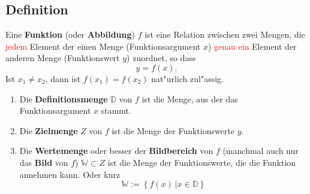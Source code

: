 \subsection{Definition}
Eine \textbf{Funktion} (oder \textbf{Abbildung}) $f$ ist eine Relation zwischen zwei Mengen, die \textcolor{red}{jedem} Element der einen Menge (Funktionsargument $x$) \textcolor{red}{genau ein} Element der anderen Menge (Funktionswert $y$) zuordnet, so dass $$y=f(x).$$
Ist $x_1 \neq x_2$, dann ist $f(x_1) = f(x_2)$ nat"urlich zul"assig.
\begin{enumerate}
\item Die \textbf{Definitionsmenge} $\mathbb{D}$ von $f$ ist die Menge, aus der das Funktionsargument $x$ stammt.
\item Die \textbf{Zielmenge} $Z$ von $f$ ist die Menge der Funktionswerte $y$.
\item Die \textbf{Wertemenge} oder besser der \textbf{Bildbereich} von $f$ (manchmal auch nur das \textbf{Bild} von $f$) $\mathbb{W} \subset Z$ ist die Menge der Funktionswerte, die die Funktion annehmen kann. Oder kurz
\begin{equation*}
\mathbb{W} := \left\{ f(x) \ | x \in \mathbb{D} \right\}
\end{equation*}
\end{enumerate}
